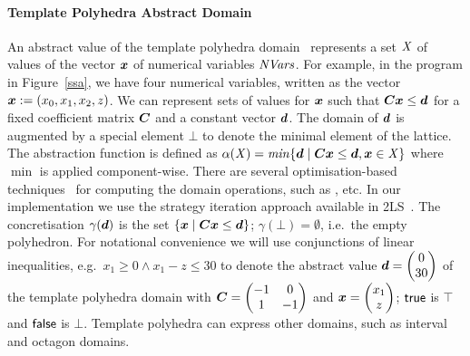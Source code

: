 \paragraph{Template Polyhedra Abstract Domain}
%
An abstract value of the template polyhedra domain~\cite{sriram}
represents a set $\mathit{X}$ of values of the vector ${\boldsymbol {x}}$ of numerical variables $\mathit{NVars}$. For
example, in the program in Figure~\ref{ssa}, we have four numerical
variables, written as the vector ${\boldsymbol {x}}:=(x_0,x_1,x_2,z)$.  We can
represent sets of values for ${\boldsymbol {x}}$ such that
${\boldsymbol C}{\boldsymbol {x}}\leq{\boldsymbol {d}}$ for a fixed coefficient matrix ${\boldsymbol C}$
and a constant vector ${\boldsymbol {d}}$. The domain of ${\boldsymbol {d}}$ is augmented
by a special element $\bot$ to denote the minimal element of the
lattice.
%
The abstraction function is defined as $\alpha(\mathit{X}) = \mathit{min} \{{\boldsymbol {d}}\mid
{\boldsymbol C}{\boldsymbol {x}}\leq{\boldsymbol {d}}, {\boldsymbol {x}}\in \mathit{X}\}$ where $\min$ is applied
component-wise. There are several optimisation-based
techniques~\cite{sriram,GS07b,BJKS15} for computing the domain
operations, such as , etc. In our implementation we
use the strategy iteration approach available in 2LS~\cite{BJKS15}.
%
The concretisation $\gamma({\boldsymbol {d}})$ is the set $\{{\boldsymbol {x}}\mid
{\boldsymbol C}{\boldsymbol {x}}\leq{\boldsymbol {d}}\}$; $\gamma(\bot)=\emptyset$, i.e.\ the empty polyhedron.
%
For notational convenience we will use conjunctions of linear
inequalities, e.g.\ $x_1\geq 0 \wedge x_1-z\leq 30$ to denote the
abstract value $\vec{\numabsval}=\vecv{0}{30}$ of the template polyhedra domain
with $\mat{C}=\qmat{-1}{0}{1}{-1}$ and $\vec{\numvar}=\vecv{x_1}{z}$;
$\mathsf{true}$ is $\top$ and $\mathsf{false}$ is $\bot$.  Template polyhedra can
express other domains, such as interval and octagon domains.

